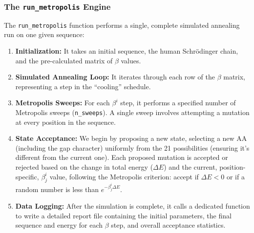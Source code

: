 \subsubsection{The \texttt{run\_metropolis} Engine}

The \texttt{run\_metropolis} function performs a single, complete simulated annealing run on one given sequence:

\begin{enumerate}
    \item \textbf{Initialization:} It takes an initial sequence, the human Schrödinger chain, and the 
        pre-calculated matrix of $\beta$ values.
    \item \textbf{Simulated Annealing Loop:} It iterates through each row of the $\beta$ matrix, 
        representing a step in the ``cooling'' schedule.
    \item \textbf{Metropolis Sweeps:} For each $\beta^i$ step, it performs a specified number of 
        Metropolis sweeps (\texttt{n\_sweeps}). A single sweep involves attempting a mutation at every position in the sequence.
    \item \textbf{State Acceptance:} We begin by proposing a new state, selecting a new AA (including the gap character) 
        uniformly from the 21 possibilities (ensuring it's different from the current one). 
        Each proposed mutation is accepted or rejected based on the change in total energy 
        ($\Delta E$) and the current, position-specific, $\beta^i_j$ value, following the Metropolis criterion: 
        accept if $\Delta E < 0$ or if a random number is less than $e^{-\beta^i_j \Delta E}$.
    \item \textbf{Data Logging:} After the simulation is complete, it calls a dedicated function to write a detailed report 
        file containing the initial parameters, the final sequence and energy for each $\beta$ step, 
        and overall acceptance statistics.
\end{enumerate}

